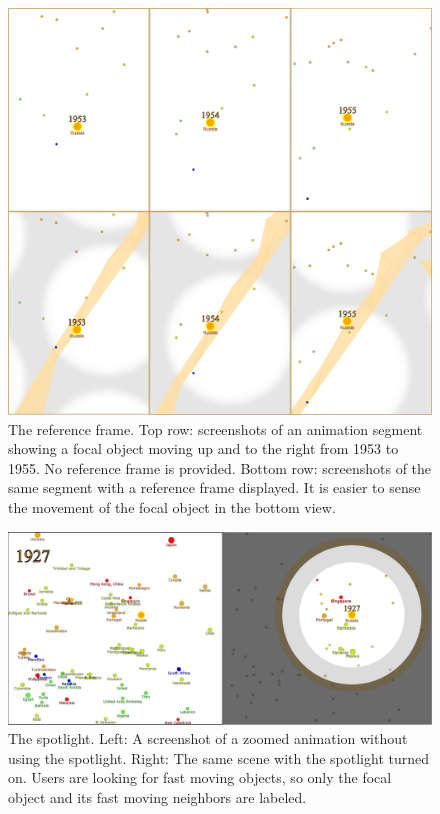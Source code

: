 \documentclass[review]{vgtc}                 %
\begin{document}
\begin{figure}[t]
\centering
\includegraphics[width=\columnwidth]{reference}
\caption{The reference frame. Top row: screenshots of an animation segment showing a focal object moving up and to the right from 1953 to 1955. No reference frame is provided. Bottom row: screenshots of the same segment with a reference frame displayed. It is easier to sense the movement of the focal object in the bottom view. }
\label{fig:reference}
\end{figure}

\begin{figure}[!h]
\centering
\includegraphics[width=\columnwidth]{mask}
\caption{The spotlight. Left: A screenshot of a zoomed animation without using the spotlight. Right: The same scene with the spotlight turned on. Users are looking for fast moving objects, so only the focal object and its fast moving neighbors are labeled.}
\label{fig:mask}
\end{figure}
\end{document}
